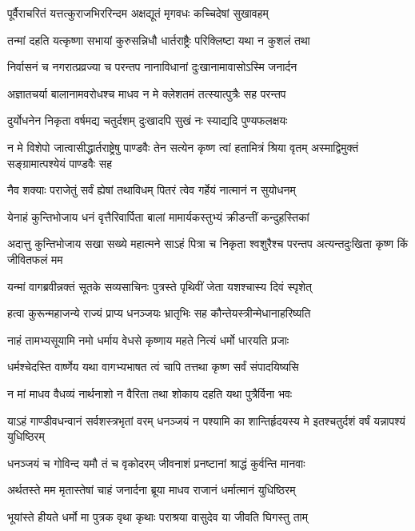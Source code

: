 \twolineshloka
{पूर्वैराचरितं यत्तत्कुराजभिररिन्दम}
{अक्षद्यूतं मृगवधः कच्चिदेषां सुखावहम्}


\twolineshloka
{तन्मां दहति यत्कृष्णा सभायां कुरुसन्निधौ}
{धार्तराष्ट्रैः परिक्लिष्टा यथा न कुशलं तथा}


\twolineshloka
{निर्वासनं च नगरात्प्रव्रज्या च परन्तप}
{नानाविधानां दुःखानामावासोऽस्मि जनार्दन}


\twolineshloka
{अज्ञातचर्या बालानामवरोधश्च माधव}
{न मे क्लेशतमं तत्स्यात्पुत्रैः सह परन्तप}


\twolineshloka
{दुर्योधनेन निकृता वर्षमद्य चतुर्दशम्}
{दुःखादपि सुखं नः स्याद्यदि पुण्यफलक्षयः}


\threelineshloka
{न मे विशेपो जात्वासीद्धार्तराष्ट्रेषु पाण्डवैः}
{तेन सत्येन कृष्ण त्वां हतामित्रं श्रिया वृतम्}
{अस्माद्विमुक्तं सङ्ग्रामात्पश्येयं पाण्डवैः सह}


\twolineshloka
{नैव शक्याः पराजेतुं सर्वं ह्येषां तथाविधम्}
{पितरं त्वेव गर्हेयं नात्मानं न सुयोधनम्}


\twolineshloka
{येनाहं कुन्तिभोजाय धनं वृत्तैरिवार्पिता}
{बालां मामार्यकस्तुभ्यं क्रीडन्तीं कन्दुहस्तिकां}


\threelineshloka
{अदात्तु कुन्तिभोजाय सखा सख्ये महात्मने}
{साऽहं पित्रा च निकृता श्वशुरैश्च परन्तप}
{अत्यन्तदुःखिता कृष्ण किं जीवितफलं मम}


\threelineshloka
{यन्मां वागब्रवीन्नक्तं सूतके सव्यसाचिनः}
{पुत्रस्ते पृथिवीं जेता यशश्चास्य दिवं स्पृशेत्}
{}


\twolineshloka
{हत्वा कुरून्महाजन्ये राज्यं प्राप्य धनञ्जयः}
{भ्रातृभिः सह कौन्तेयस्त्रीन्मेधानाहरिष्यति}


\twolineshloka
{नाहं तामभ्यसूयामि नमो धर्माय वेधसे}
{कृष्णाय महते नित्यं धर्मो धारयति प्रजाः}


\twolineshloka
{धर्मश्चेदस्ति वार्ष्णेय यथा वागभ्यभाषत}
{त्वं चापि तत्तथा कृष्ण सर्वं संपादयिष्यसि}


\twolineshloka
{न मां माधव वैधव्यं नार्थनाशो न वैरिता}
{तथा शोकाय दहति यथा पुत्रैर्विना भवः}


\threelineshloka
{याऽहं गाण्डीवधन्वानं सर्वशस्त्रभृतां वरम्}
{धनञ्जयं न पश्यामि का शान्तिर्हृदयस्य मे}
{इतश्चतुर्दशं वर्षं यन्नापश्यं युधिष्ठिरम्}


\twolineshloka
{धनञ्जयं च गोविन्द यमौ तं च वृकोदरम्}
{जीवनाशं प्रनष्टानां श्राद्धं कुर्वन्ति मानवाः}


\twolineshloka
{अर्थतस्ते मम मृतास्तेषां चाहं जनार्दना}
{ब्रूया माधव राजानं धर्मात्मानं युधिष्ठिरम्}


\twolineshloka
{भूयांस्ते हीयते धर्मो मा पुत्रक वृथा कृथाः}
{पराश्रया वासुदेव या जीवति घिगस्तु ताम्}


